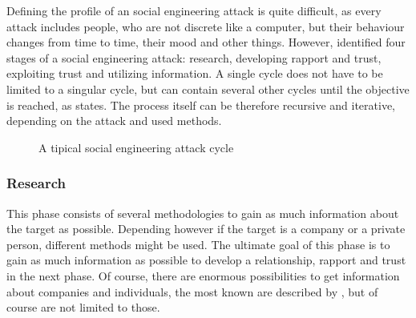 Defining the profile of an social engineering attack is quite difficult, as
every attack includes people, who are not discrete like a computer, but their
behaviour changes from time to time, their mood and other things. However,
\cite{mitnick2003} identified four stages of a social engineering attack:
research, developing rapport and trust, exploiting trust and utilizing
information. A single cycle does not have to be limited to a singular cycle, but
can contain several other cycles until the objective is reached, as
\cite{thornburgh2004} states. The process itself can be therefore recursive and
iterative, depending on the attack and used methods.

\begin{figure}
  \begin{center}

    \caption{A tipical social engineering attack cycle}
  \end{center}
\end{figure}

\subsubsection{Research}

This phase consists of several methodologies to gain as much information about
the target as possible. Depending however if the target is a company or a
private person, different methods might be used. The ultimate goal of this
phase is to gain as much information as possible to develop a relationship,
rapport and trust in the next phase. Of course, there are enormous
possibilities to get information about companies and individuals, the most
known are described by \cite{jones2004,mitnick2003,thornburgh2004}, but of
course are not limited to those.


